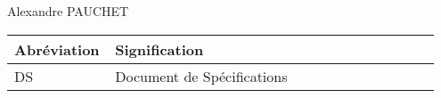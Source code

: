 \begin{pagesService}

  \begin{historique}
  \end{historique}

  \begin{suiviDiffusions}
    
    {
      \begin{lesDestinataires}
      \item Alexandre PAUCHET
      \end{lesDestinataires}
    }
  \end{suiviDiffusions}

  \begin{signatures}
  \end{signatures}
  \begin{documentsReference}
    \begin{listeDeReferences}
    \end{listeDeReferences}	
  \end{documentsReference}

  \begin{terminologie}
    \begin{center}
      \begin{longtable}{|p{0.2\linewidth}|p{0.75\linewidth}|}
        \hline  %
        \rowcolor[gray]{.8}
        Abréviation         &             Signification    \\
        \hline
        DS & Document de Spécifications \\
        \hline
      \end{longtable}
    \end{center}
  \end{terminologie}
\end{pagesService}
